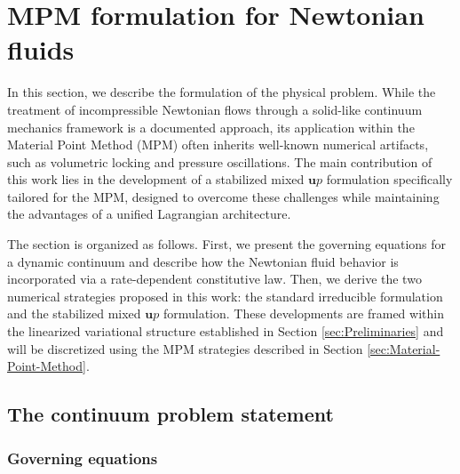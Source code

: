 \documentclass[11pt,english]{article}
\def\up{$\boldsymbol{u}p$\xspace}
\begin{document}
%
%


\section{MPM formulation for Newtonian fluids} \label{sec:Modeling-Newtonian-fluid-flow}

In this section, we describe the formulation of the physical problem. While the treatment of incompressible Newtonian flows through a solid-like continuum mechanics framework is a documented approach, its application within the Material Point Method (MPM) often inherits well-known numerical artifacts, such as volumetric locking and pressure oscillations. The main contribution of this work lies in the development of a stabilized mixed \up formulation specifically tailored for the MPM, designed to overcome these challenges while maintaining the advantages of a unified Lagrangian architecture.

The section is organized as follows. First, we present the governing equations for a dynamic continuum and describe how the Newtonian fluid behavior is incorporated via a rate-dependent constitutive law. Then, we derive the two numerical strategies proposed in this work: the standard irreducible formulation and the stabilized mixed \up formulation. These developments are framed within the linearized variational structure established in Section \ref{sec:Preliminaries} and will be discretized using the MPM strategies described in Section \ref{sec:Material-Point-Method}.

\subsection{The continuum problem statement}
    
    \subsubsection{Governing equations \label{sec:continuum_problem_statement}}    
    
\end{document}
